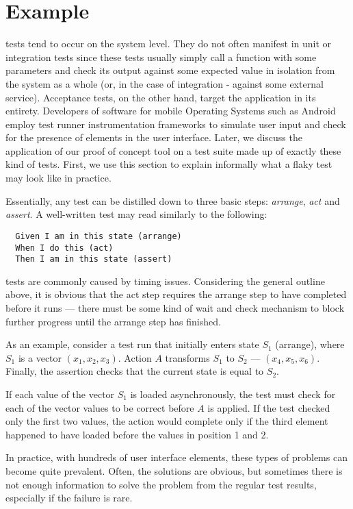 \section{Example}
\label{sec:example}

\Flaky tests tend to occur on the system level. They do not often manifest in
unit or integration tests since these tests usually simply call a function with
some parameters and check its output against some expected value in isolation
from the system as a whole (or, in the case of integration - against some
external service). Acceptance tests, on the other hand, target the application
in its entirety. Developers of software for mobile Operating Systems such as
Android employ test runner instrumentation frameworks to simulate user input and
check for the presence of elements in the user interface. Later, we discuss the
application of our proof of concept tool on a test suite made up of exactly
these kind of tests. First, we use this section to explain informally what a
flaky test may look like in practice.

Essentially, any test can be distilled down to three basic steps:
\textit{arrange}, \textit{act} and \textit{assert}. A well-written test may read
similarly to the following:
\begin{verbatim}
  Given I am in this state (arrange)
  When I do this (act)
  Then I am in this state (assert)
\end{verbatim}

\Flaky tests are commonly caused by timing issues. Considering the general
outline above, it is obvious that the act step requires the arrange step to have
completed before it runs --- there must be some kind of wait and check mechanism
to block further progress until the arrange step has finished.

As an example, consider a test run that initially enters state $S_{1}$
(arrange), where $S_{1}$ is a vector $(x_{1},x_{2},x_{3})$. Action $A$
transforms $S_1$ to $S_2$ --- $(x_{4},x_{5},x_{6})$. Finally, the assertion
checks that the current state is equal to $S_2$.

If each value of the vector $S_{1}$ is loaded asynchronously, the test must
check for each of the vector values to be correct before $A$ is applied. If the
test checked only the first two values, the action would complete only if the
third element happened to have loaded before the values in position 1 and 2.

In practice, with hundreds of user interface elements, these types of problems
can become quite prevalent. Often, the solutions are obvious, but sometimes
there is not enough information to solve the problem from the regular test
results, especially if the failure is rare.
